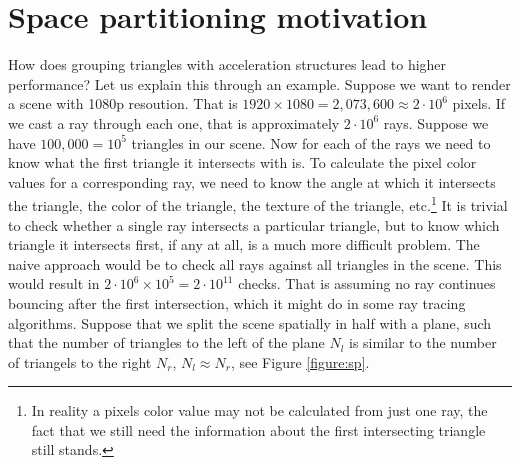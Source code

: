 \documentclass[12pt]{article}
\begin{document}
\section{Space partitioning motivation}
How does grouping triangles with acceleration structures lead to higher performance? Let us explain this through an example. Suppose we want to render a scene with 1080p resoution. That is $1920 \times 1080 = 2,073,600 \approx 2 \cdot 10^6$ pixels. If we cast a ray through each one, that is approximately $2 \cdot 10^6$ rays. Suppose we have $100,000=10^5$ triangles in our scene. Now for each of the rays we need to know what the first triangle it intersects with is. To calculate the pixel color values for a corresponding ray, we need to know the angle at which it intersects the triangle, the color of the triangle, the texture of the triangle, etc.\footnote{In reality a pixels color value may not be calculated from just one ray, the fact that we still need the information about the first intersecting triangle still stands.} It is trivial to check whether a single ray intersects a particular triangle, but to know which triangle it intersects first, if any at all, is a much more difficult problem. The naive approach would be to check all rays against all triangles in the scene. This would result in $2\cdot10^6\times10^5=2\cdot10^{11}$ checks. That is assuming no ray continues bouncing after the first intersection, which it might do in some ray tracing algorithms. Suppose that we split the scene spatially in half with a plane, such that the number of triangles to the left of the plane $N_l$ is similar to the number of triangels to the right $N_r$, $N_l \approx N_r$, see Figure \ref{figure:sp}.\\
\end{document}
